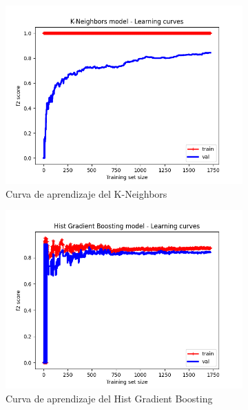 \begin{figure}[!ht]
\begin{subfigure}[b]{0.3\textwidth}
        \includegraphics[width=\linewidth]{media/images/learning-curves/knn.png}
        \caption{Curva de aprendizaje del K-Neighbors}
        \label{sfig:lc-knn}
    \end{subfigure}
    \begin{subfigure}[b]{0.3\textwidth}
        \includegraphics[width=\linewidth]{media/images/learning-curves/hgb.png}
        \caption{Curva de aprendizaje del Hist Gradient Boosting}
        \label{sfig:lc-hgb}
    \end{subfigure}
    \begin{subfigure}[b]{0.3\textwidth}

\end{subfigure}
\end{figure}
